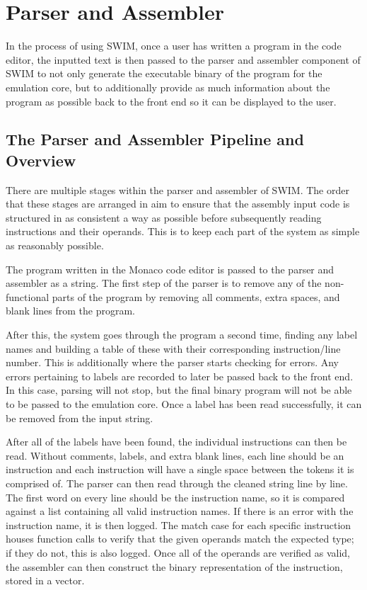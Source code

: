 \documentclass[
    paper=letter,
    parskip=half,
    fontsize=12pt,
    titlepage=firstiscover,
    toc=bibliography,
    numbers=endperiod
]{scrartcl}
\let\oldsection\section
\renewcommand{\section}{\newpage\oldsection}
\begin{document}
\section{Parser and Assembler}
\label{sec:parser}

In the process of using SWIM, once a user has written a program in the
code editor, the inputted text is then passed to the parser and
assembler component of SWIM to not only generate the executable binary
of the program for the emulation core, but to additionally provide as
much information about the program as possible back to the front end so
it can be displayed to the user.

\subsection{The Parser and Assembler Pipeline and Overview}

There are multiple stages within the parser and assembler of SWIM. The
order that these stages are arranged in aim to ensure that the assembly
input code is structured in as consistent a way as possible before
subsequently reading instructions and their operands. This is to keep
each part of the system as simple as reasonably possible.

The program written in the Monaco code editor is passed to the parser
and assembler as a string. The first step of the parser is to remove any
of the non-functional parts of the program by removing all comments,
extra spaces, and blank lines from the program.

After this, the system goes through the program a second time, finding
any label names and building a table of these with their corresponding
instruction/line number. This is additionally where the parser starts
checking for errors. Any errors pertaining to labels are recorded to
later be passed back to the front end. In this case, parsing will not
stop, but the final binary program will not be able to be passed to the
emulation core. Once a label has been read successfully, it can be
removed from the input string.

After all of the labels have been found, the individual instructions can
then be read. Without comments, labels, and extra blank lines, each line
should be an instruction and each instruction will have a single space
between the tokens it is comprised of. The parser can then read through
the cleaned string line by line. The first word on every line should be
the instruction name, so it is compared against a list containing all
valid instruction names. If there is an error with the instruction name,
it is then logged. The match case for each specific instruction houses
function calls to verify that the given operands match the expected
type; if they do not, this is also logged. Once all of the operands are
verified as valid, the assembler can then construct the binary
representation of the instruction, stored in a vector.
\end{document}
